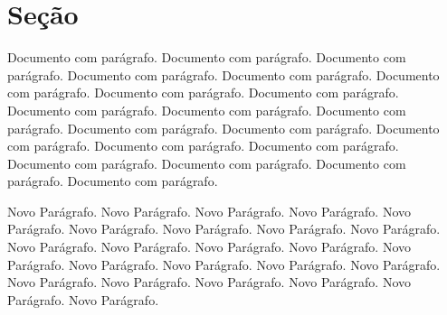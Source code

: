 \documentclass{report}
\begin{document}
	
	\section{Seção}
	Documento com parágrafo. Documento com parágrafo. Documento com parágrafo. Documento com parágrafo. Documento com parágrafo. Documento com parágrafo. Documento com parágrafo. Documento com parágrafo. Documento com parágrafo. Documento com parágrafo. Documento com parágrafo. Documento com parágrafo. Documento com parágrafo. Documento com parágrafo. Documento com parágrafo. Documento com parágrafo. Documento com parágrafo. Documento com parágrafo. Documento com parágrafo. Documento com parágrafo.
	
	Novo Parágrafo. Novo Parágrafo. Novo Parágrafo. Novo Parágrafo. Novo Parágrafo. Novo Parágrafo. Novo Parágrafo. Novo Parágrafo. Novo Parágrafo. Novo Parágrafo. Novo Parágrafo. Novo Parágrafo. Novo Parágrafo. Novo Parágrafo. Novo Parágrafo. Novo Parágrafo. Novo Parágrafo. Novo Parágrafo. Novo Parágrafo. Novo Parágrafo. Novo Parágrafo. Novo Parágrafo. Novo Parágrafo. Novo Parágrafo.
	
\end{document}
